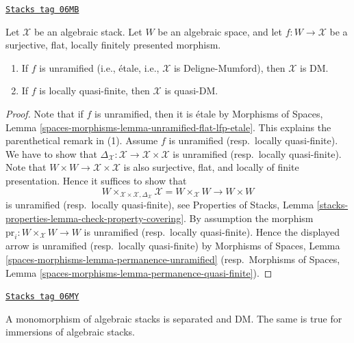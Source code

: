 \begin{lemma}
\label{stacks-morphisms-lemma-properties-covering-imply-diagonal}
\href{https://stacks.math.columbia.edu/tag/06MB}{\texttt{Stacks tag 06MB}}

Let $\mathcal{X}$ be an algebraic stack.
Let $W$ be an algebraic space, and let $f : W \to \mathcal{X}$
be a surjective, flat, locally finitely presented morphism.
\begin{enumerate}
\item If $f$ is unramified (i.e., \'etale, i.e., $\mathcal{X}$
is Deligne-Mumford), then $\mathcal{X}$ is DM.
\item If $f$ is locally quasi-finite, then $\mathcal{X}$ is quasi-DM.
\end{enumerate}
\end{lemma}

\begin{proof}
Note that if $f$ is unramified, then it is \'etale by
Morphisms of Spaces, Lemma
\ref{spaces-morphisms-lemma-unramified-flat-lfp-etale}.
This explains the parenthetical remark in (1).
Assume $f$ is unramified (resp.\ locally quasi-finite). We have to show that
$\Delta_\mathcal{X} : \mathcal{X} \to \mathcal{X} \times \mathcal{X}$
is unramified (resp.\ locally quasi-finite). Note that
$W \times W \to \mathcal{X} \times \mathcal{X}$ is also
surjective, flat, and locally of finite presentation. Hence it suffices to
show that
$$
W \times_{\mathcal{X} \times \mathcal{X}, \Delta_\mathcal{X}} \mathcal{X}
=
W \times_\mathcal{X} W
\longrightarrow
W \times W
$$
is unramified (resp.\ locally quasi-finite), see
Properties of Stacks, Lemma
\ref{stacks-properties-lemma-check-property-covering}.
By assumption the morphism $\text{pr}_i : W \times_\mathcal{X} W \to W$
is unramified (resp.\ locally quasi-finite). Hence
the displayed arrow is unramified (resp.\ locally quasi-finite) by
Morphisms of Spaces, Lemma
\ref{spaces-morphisms-lemma-permanence-unramified}
(resp.\ Morphisms of Spaces, Lemma
\ref{spaces-morphisms-lemma-permanence-quasi-finite}).
\end{proof}

\begin{lemma}
\label{stacks-morphisms-lemma-monomorphism-separated}
\href{https://stacks.math.columbia.edu/tag/06MY}{\texttt{Stacks tag 06MY}}

A monomorphism of algebraic stacks is separated and DM.
The same is true for immersions of algebraic stacks.
\end{lemma}

